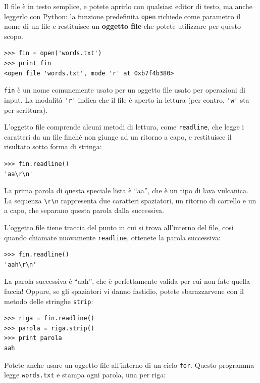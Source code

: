 \documentclass[10pt]{book}
\begin{document}
Il file è in testo semplice, e potete aprirlo con qualsiasi editor di testo, ma anche leggerlo con Python: la funzione predefinita {\tt open} richiede come parametro il nome di un file e restituisce un {\bf oggetto file} che potete utilizzare per questo scopo.

\begin{verbatim}
>>> fin = open('words.txt')
>>> print fin
<open file 'words.txt', mode 'r' at 0xb7f4b380>
\end{verbatim}
%
{\tt fin} è un nome comunemente usato per un oggetto file usato per operazioni di input. La modalità \verb"'r'" indica che il file è aperto in lettura (per contro, \verb"'w'" sta per scrittura).

L'oggetto file comprende alcuni metodi di lettura, come {\tt readline}, che legge i caratteri da un file finché non giunge ad un ritorno a capo, e restituisce il risultato sotto forma di stringa:

\begin{verbatim}
>>> fin.readline()
'aa\r\n'
\end{verbatim}
%
La prima parola di questa speciale lista è ``aa'', che è un tipo di lava vulcanica. La sequenza \verb"\r\n" rappresenta due caratteri spaziatori, un ritorno di carrello e un a capo, che separano questa parola dalla successiva.

L'oggetto file tiene traccia del punto in cui si trova all'interno del file, così quando chiamate nuovamente {\tt readline}, ottenete la parola successiva:

\begin{verbatim}
>>> fin.readline()
'aah\r\n'
\end{verbatim}
%
La parola successiva è ``aah'', che è perfettamente valida per cui non fate quella faccia! Oppure, se gli spaziatori vi danno fastidio, potete sbarazzarvene con il metodo delle stringhe {\tt strip}:

\begin{verbatim}
>>> riga = fin.readline()
>>> parola = riga.strip()
>>> print parola
aah
\end{verbatim}
%
Potete anche usare un oggetto file all'interno di un ciclo {\tt for}.
Questo programma legge {\tt words.txt} e stampa ogni parola, una per riga:
\end{document}

